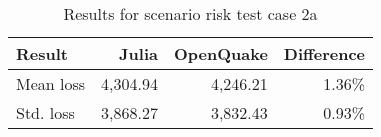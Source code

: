 \begin{table}[htbp]

\centering
\begin{tabular}{ l r r r }

\hline
\rowcolor{anti-flashwhite}
\bf{Result} & \bf{Julia} & \bf{OpenQuake} & \bf{Difference}\\
\hline
Mean loss & 4,304.94 & 4,246.21 & 1.36\% \\
Std. loss & 3,868.27 & 3,832.43 & 0.93\% \\
\hline
\end{tabular}

\caption{Results for scenario risk test case 2a}
\label{tab:result-sr-2a}
\end{table}
